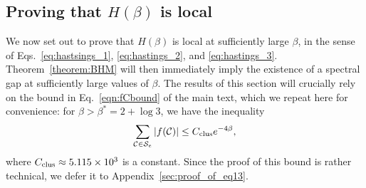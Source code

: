 \subsection{Proving that \texorpdfstring{$H(\beta)$}{Hbeta} is local}
\label{subsec:locality_proof}
We now set out to prove that $H(\beta)$ is local at sufficiently large $\beta$, in the sense of Eqs.~\eqref{eq:hastsings_1}, \eqref{eq:hastings_2}, and \eqref{eq:hastings_3}. Theorem~\ref{theorem:BHM} will then immediately imply the existence of a spectral gap at sufficiently large values of $\beta$. The results of this section will crucially rely on the bound in Eq.~\eqref{eqn:fCbound} of the main text, which we repeat here for convenience: for $\beta > \beta^* = 2 + \log 3$, we have the inequality
\begin{equation}
\label{eq:app_fc_bound}
    \sum_{\mathcal{C} \in \mathcal{S}_e} \abs{f(\mathcal{C})} \leq C_{\mathrm{clus}} e^{-4\beta} ,
\end{equation}
where $C_{\mathrm{clus}} \approx 5.115 \times 10^3$ is a constant. Since the proof of this bound is rather technical, we defer it to Appendix~\ref{sec:proof_of_eq13}.

